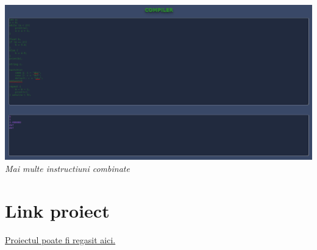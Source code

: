 \documentclass{article}
\begin{document}
\begin{center}
\includegraphics[scale = 0.4]{combined.png}\\
\textit{Mai multe instructiuni combinate}
\end{center}

\section{Link proiect}
\href{https://github.com/floreaneusebiu3/CODE_COMPILER}{Proiectul poate fi regasit aici.}
\end{document}
